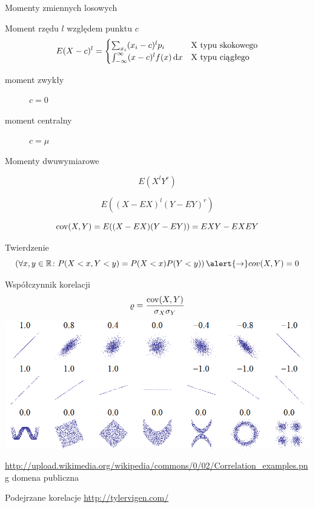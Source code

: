 \documentclass{mp}
\subtitle{Momenty dwuwymiarowe}
\begin{document}
\frame{\titlepage}
\begin{frame}{Momenty zmiennych losowych}
\begin{block}{Moment rzędu $l$ względem punktu $c$}
\[ E(X-c)^l=\begin{cases} \sum_{x_i} (x_i-c)^lp_i & $X$\text{ typu skokowego} \\
\int_{-\infty}^\infty (x-c)^lf(x)\d{x} & $X$\text{ typu ciągłego}
\end{cases} \]
\end{block}
\begin{description}
\item[moment zwykły] $c=0$
\item[moment centralny] $c=\mu$
\end{description}
\end{frame}
\begin{frame}{Momenty dwuwymiarowe}
\begin{description}
\item<+->[moment zwykły rzędu $l+r$] \[E(X^lY^r)\]
\item<+->[moment centralny rzędu $l+r$] \[E((X-EX)^l(Y-EY)^r)\]
\item<+->[kowariancja] \[\operatorname{cov}(X,Y)=E((X-EX)(Y-EY))=EXY-EXEY\]
\end{description}
\only<+->
{
\begin{block}{Twierdzenie}
\[\left(\forall x,y\in\R\colon P(X<x,Y<y)=P(X<x)P(Y<y) \right) \alert{\to} cov(X,Y)=0 \]
\end{block}
}
\end{frame}
\begin{frame}{Współczynnik korelacji}
\[\varrho=\frac{\operatorname{cov}(X,Y)}{\sigma_X\sigma_Y} \]
\includegraphics[width=\textwidth]{10_korelacja/Correlation_examples.png}

{\tiny \url{http://upload.wikimedia.org/wikipedia/commons/0/02/Correlation_examples.png} domena publiczna}
\end{frame}
\begin{frame}{Podejrzane korelacje}
\url{http://tylervigen.com/}
\end{frame}
\end{document}
